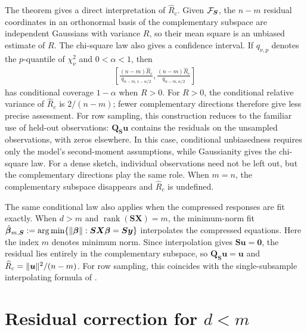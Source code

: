\documentclass{article}
\theoremstyle{plain}
\theoremstyle{definition}
\theoremstyle{definition}
\newcommand{\boldzero}{\mathbf{0}}
\DeclarePairedDelimiter\norm{\lVert}{\rVert}
\def\argmin{\mathop{\rm arg\, min}}
\DeclareMathOperator{\rank}{rank}
\def\mathbold{\boldsymbol}
\def\bQ{\mathbold{Q}}\def\hbQ{{\widehat{\bQ}}}\def\tbQ{{\widetilde{\bQ}}}
\def\bS{\mathbold{S}}\def\hbS{{\widehat{\bS}}}\def\tbS{{\widetilde{\bS}}}
\def\bu{\mathbold{u}}\def\uhat{\widehat{u}}\def\util{\widetilde{u}}\def\ubar{{\overline u}}
\def\bX{\mathbold{X}}\def\hbX{{\widehat{\bX}}}\def\tbX{{\tilde{\bX}}}\def\bXbar{{\overline \bX}}
\def\by{\mathbold{y}}\def\yhat{\widehat{y}}\def\ytil{\widetilde{y}}\def\ybar{{\overline y}}\def\vby{{\bf y}}
\def\bbeta{\mathbold{\beta}}\def\betahat{\widehat{\beta}}\def\hbeta{\widehat{\beta}}
\def\hbbeta{\hat{\bbeta}{}}
\begin{document}
The theorem gives a direct interpretation of $\widehat R_c$. Given $\calF_{\bS}$, the $n-m$ residual coordinates in an orthonormal basis of the complementary subspace are independent Gaussians with variance $R$, so their mean square is an unbiased estimate of $R$. The chi-square law also gives a confidence interval. If $q_{\nu,p}$ denotes the $p$-quantile of $\chi^2_\nu$ and $0<\alpha<1$, then
\begin{align}
 \left[
 \frac{(n-m)\widehat R_c}{q_{n-m,1-\alpha/2}},
 \frac{(n-m)\widehat R_c}{q_{n-m,\alpha/2}}
 \right]
 \label{eq:cpal-risk-interval}
\end{align}
has conditional coverage $1-\alpha$ when $R>0$. For $R>0$, the conditional relative variance of $\widehat R_c$ is $2/(n-m)$; fewer complementary directions therefore give less precise assessment. For row sampling, this construction reduces to the familiar use of held-out observations: $\bQ_{\bS}\bu$ contains the residuals on the unsampled observations, with zeros elsewhere. In this case, conditional unbiasedness requires only the model's second-moment assumptions, while Gaussianity gives the chi-square law. For a dense sketch, individual observations need not be left out, but the complementary directions play the same role. When $m=n$, the complementary subspace disappears and $\widehat R_c$ is undefined.

The same conditional law also applies when the compressed responses are fit exactly. When $d>m$ and $\rank(\bS\bX)=m$, the minimum-norm fit
$\hbbeta_{m,\bS}:=\argmin\{\norm{\bbeta}:\bS\bX\bbeta=\bS\by\}$
interpolates the compressed equations. Here the index $m$ denotes minimum norm. Since interpolation gives
$\bS\bu=\boldzero$, the residual lies entirely in the complementary subspace, so $\bQ_{\bS}\bu=\bu$ and
$\widehat R_c=\norm{\bu}^2/(n-m)$.
For row sampling, this coincides with the single-subsample interpolating formula of \citet{bellec2025corrected}.




\section{Residual correction for \texorpdfstring{$d<m$}{d < m}}
\label{sec:underparameterized-transfer}
\end{document}
